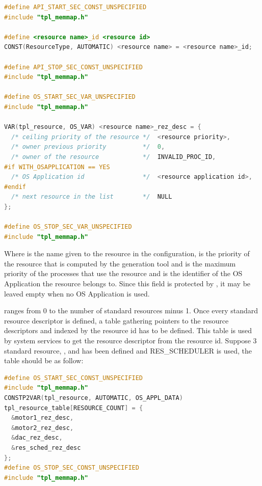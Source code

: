 \begin{lstlisting}[language=C]
#define API_START_SEC_CONST_UNSPECIFIED
#include "tpl_memmap.h"

#define <resource name>_id <resource id>
CONST(ResourceType, AUTOMATIC) <resource name> = <resource name>_id;

#define API_STOP_SEC_CONST_UNSPECIFIED
#include "tpl_memmap.h"

#define OS_START_SEC_VAR_UNSPECIFIED
#include "tpl_memmap.h"

VAR(tpl_resource, OS_VAR) <resource name>_rez_desc = {
  /* ceiling priority of the resource */  <resource priority>,
  /* owner previous priority          */  0,
  /* owner of the resource            */  INVALID_PROC_ID,
#if WITH_OSAPPLICATION == YES
  /* OS Application id                */  <resource application id>,
#endif    
  /* next resource in the list        */  NULL
};

#define OS_STOP_SEC_VAR_UNSPECIFIED
#include "tpl_memmap.h"
\end{lstlisting}

Where  is the name given to the resource in the configuration,  is the priority of the resource that is computed by the generation tool and is the maximum priority of the processes that use the resource and  is the identifier of the OS Application the resource belongs to. Since this field is protected by , it may be leaved empty when no OS Application is used.

 ranges from 0 to the number of standard resources minus 1. Once every standard resource descriptor is defined, a table gathering pointers to the resource descriptors and indexed by the resource id has to be defined. This table is used by system services to get the resource descriptor from the resource id. Suppose 3 standard resource, ,  and  has been defined and RES_SCHEDULER is used, the table should be as follow:

\begin{lstlisting}[language=C]
#define OS_START_SEC_CONST_UNSPECIFIED
#include "tpl_memmap.h"
CONSTP2VAR(tpl_resource, AUTOMATIC, OS_APPL_DATA)
tpl_resource_table[RESOURCE_COUNT] = {
  &motor1_rez_desc,
  &motor2_rez_desc,
  &dac_rez_desc,
  &res_sched_rez_desc  
};
#define OS_STOP_SEC_CONST_UNSPECIFIED
#include "tpl_memmap.h"
\end{lstlisting}


